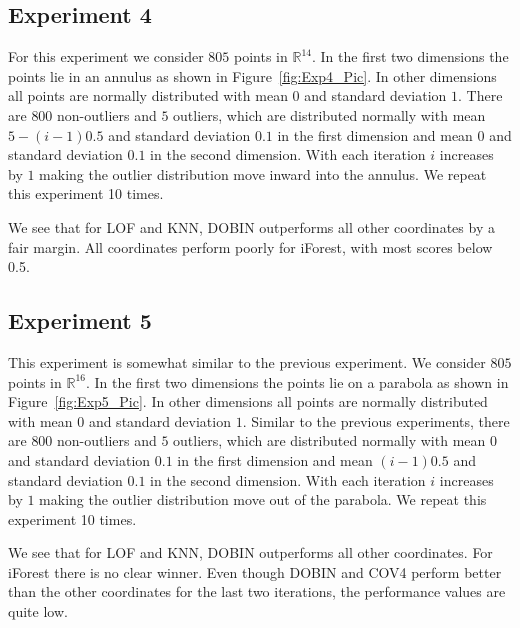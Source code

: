 \documentclass[letter,12pt]{article}
\begin{document}
{\color{blue}
\subsection{Experiment 4}

For this experiment we consider $805$ points in $\mathbb{R}^{14}$. In the first two dimensions the points lie in an annulus as shown in Figure~\ref{fig:Exp4_Pic}. In other dimensions all points are normally distributed with mean $0$ and standard deviation $1$. There are $800$  non-outliers and $5$ outliers, which are distributed normally with mean $5 - (i-1)0.5$ and standard deviation $0.1$ in the first dimension and mean $0$ and standard deviation $0.1$ in the second dimension. With each iteration $i$ increases by $1$ making the outlier distribution move inward into the annulus. We repeat this experiment 10 times. 

We see that for LOF and KNN,  DOBIN outperforms all other coordinates by a fair margin. All coordinates perform poorly for iForest, with most scores below 0.5. 


\subsection{Experiment 5}

This experiment is somewhat similar to the previous experiment. We consider $805$ points in $\mathbb{R}^{16}$. In the first two dimensions the points lie on a parabola as shown in Figure~\ref{fig:Exp5_Pic}. In other dimensions all points are normally distributed with mean $0$ and standard deviation $1$. Similar to the previous experiments, there are $800$  non-outliers and $5$ outliers, which are distributed normally with mean $0$ and standard deviation $0.1$ in the first dimension and mean $(i-1)0.5$ and standard deviation $0.1$ in the second dimension. With each iteration $i$ increases by $1$ making the outlier distribution move out of the parabola.  We repeat this experiment 10 times. 

We see that for LOF and KNN,  DOBIN outperforms all other coordinates. For iForest there is no clear winner. Even though DOBIN and COV4 perform better than the other coordinates for the last two iterations, the performance values are quite low. 

}
\end{document}
